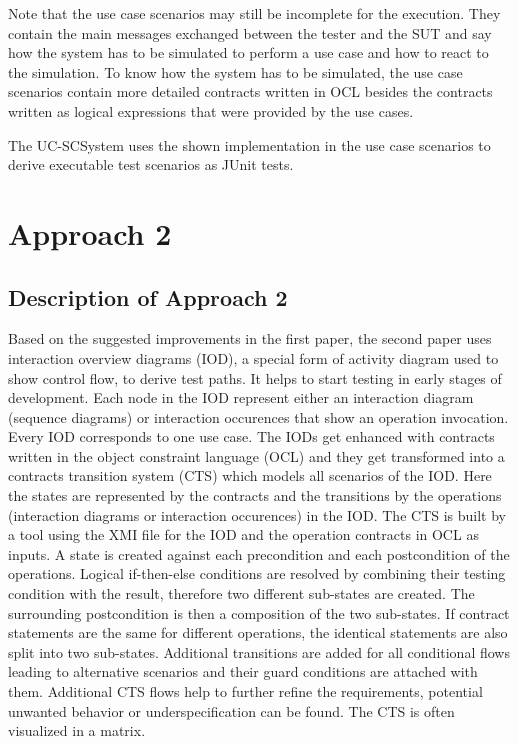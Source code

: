 Note that the use case scenarios may still be incomplete for the execution. They contain the main messages exchanged between the tester and the SUT and say how the system has to be simulated to perform a use case and how to react to the simulation. To know how the system has to be simulated, the use case scenarios contain more detailed contracts written in OCL besides the contracts written as logical expressions that were provided by the use cases. 

The UC-SCSystem uses the shown implementation in the use case scenarios to derive executable test scenarios as JUnit tests.

\section{Approach 2} \label{approachtwo}

\subsection{Description of Approach 2}

Based on the suggested improvements in the first paper, the second paper uses interaction overview diagrams (IOD), a special form of activity diagram used to show control flow, to derive test paths. It helps to start testing in early stages of development. Each node in the IOD represent either an interaction diagram (sequence diagrams) or interaction occurences that show an operation invocation. Every IOD corresponds to one use case. The IODs get enhanced with contracts written in the object constraint language (OCL) and they get transformed into a contracts transition system (CTS) which models all scenarios of the IOD. Here the states are represented by the contracts and the transitions by the operations (interaction diagrams or interaction occurences) in the IOD. The CTS is built by a tool using the XMI file for the IOD and the operation contracts in OCL as inputs. A state is created against each precondition and each postcondition of the operations. Logical if-then-else conditions are resolved by combining their testing condition with the result, therefore two different sub-states are created. The surrounding postcondition is then a composition of the two sub-states. If contract statements are the same for different operations, the identical statements are also split into two sub-states. Additional transitions are added for all conditional flows leading to alternative scenarios and their guard conditions are attached with them. Additional CTS flows help to further refine the requirements, potential unwanted behavior or underspecification can be found. The CTS is often visualized in a matrix. 

